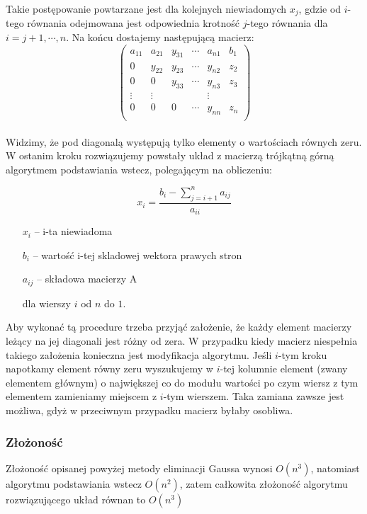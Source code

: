 \documentclass[12pt, a4paper]{article}
\begin{document}
\noindent Takie postępowanie powtarzane jest dla kolejnych niewiadomych $x_{j}$, gdzie od $i$-tego równania odejmowana jest odpowiednia krotność $j$-tego równania dla $i = j+1, \cdots, n$. Na końcu dostajemy następującą macierz:\\

\begin{equation}
\left(\begin{array}{ccccc|c}
a_{11} & a_{21} & y_{31} & \cdots & a_{n1} & b_1\\
0      & y_{22} & y_{23} & \cdots & y_{n2} & z_2\\
0      & 0      & y_{33} & \cdots & y_{n3} & z_3\\
\vdots & \vdots &        &        & \vdots & \\
0      & 0      & 0      & \cdots & y_{nn} & z_n\\
\end{array}\right)
\end{equation} \\

\noindent Widzimy, że pod diagonalą występują tylko elementy o wartościach równych zeru. W ostanim kroku rozwiązujemy powstały układ z macierzą trójkątną górną algorytmem podstawiania wstecz, polegającym na obliczeniu:

$$
x_i = \frac{b_i - \sum_{j = i+1}^n a_{ij}}{a_{ii}}
$$
\begin{itemize}
\item[$x_i$]-- i-ta niewiadoma
\item[$b_i$]-- wartość i-tej skladowej wektora prawych stron
\item[$a_{ij}$]-- składowa macierzy A
\item[]dla wierszy $i$ od $n$ do $1$.
\end{itemize}

\noindent Aby wykonać tą procedure trzeba przyjąć założenie, że każdy element macierzy leżący na jej diagonali jest różny od zera. W przypadku kiedy macierz niespełnia takiego założenia konieczna jest modyfikacja algorytmu. Jeśli $i$-tym kroku napotkamy element równy zeru wyszukujemy w $i$-tej kolumnie element (zwany elementem głównym) o największej co do modułu wartości po czym wiersz z tym elementem zamieniamy miejscem z $i$-tym wierszem. Taka zamiana zawsze jest możliwa, gdyż w przeciwnym przypadku macierz byłaby osobliwa. \\

\subsubsection*{Złożoność}
Złożoność opisanej powyżej metody  eliminacji Gaussa wynosi
$O(n^3)$, natomiast algorytmu podstawiania wstecz $O(n^2)$, zatem całkowita złożoność algorytmu rozwiązującego układ równan to $O(n^3)$
\end{document}
